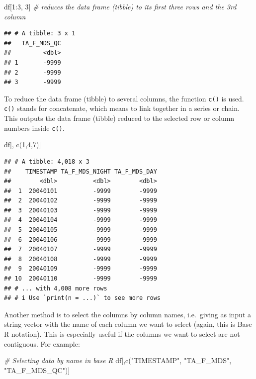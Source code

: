 \documentclass[
]{book}
\newenvironment{Shaded}{\begin{snugshade}}{\end{snugshade}}
\newcommand{\CommentTok}[1]{\textcolor[rgb]{0.56,0.35,0.01}{\textit{#1}}}
\newcommand{\DecValTok}[1]{\textcolor[rgb]{0.00,0.00,0.81}{#1}}
\newcommand{\FunctionTok}[1]{\textcolor[rgb]{0.00,0.00,0.00}{#1}}
\newcommand{\NormalTok}[1]{#1}
\newcommand{\SpecialCharTok}[1]{\textcolor[rgb]{0.00,0.00,0.00}{#1}}
\newcommand{\StringTok}[1]{\textcolor[rgb]{0.31,0.60,0.02}{#1}}
\begin{document}
\begin{Shaded}
\begin{Highlighting}[]
\NormalTok{df[}\DecValTok{1}\SpecialCharTok{:}\DecValTok{3}\NormalTok{, }\DecValTok{3}\NormalTok{] }\CommentTok{\# reduces the data frame (tibble) to its first three rows and the 3rd column}
\end{Highlighting}
\end{Shaded}

\begin{verbatim}
## # A tibble: 3 x 1
##   TA_F_MDS_QC
##         <dbl>
## 1       -9999
## 2       -9999
## 3       -9999
\end{verbatim}

To reduce the data frame (tibble) to several columns, the function \texttt{c()} is used. \texttt{c()} stands for concatenate, which means to link together in a series or chain. This outputs the data frame (tibble) reduced to the selected row or column numbers inside \texttt{c()}.

\begin{Shaded}
\begin{Highlighting}[]
\NormalTok{df[, }\FunctionTok{c}\NormalTok{(}\DecValTok{1}\NormalTok{,}\DecValTok{4}\NormalTok{,}\DecValTok{7}\NormalTok{)]}
\end{Highlighting}
\end{Shaded}

\begin{verbatim}
## # A tibble: 4,018 x 3
##    TIMESTAMP TA_F_MDS_NIGHT TA_F_MDS_DAY
##        <dbl>          <dbl>        <dbl>
##  1  20040101          -9999        -9999
##  2  20040102          -9999        -9999
##  3  20040103          -9999        -9999
##  4  20040104          -9999        -9999
##  5  20040105          -9999        -9999
##  6  20040106          -9999        -9999
##  7  20040107          -9999        -9999
##  8  20040108          -9999        -9999
##  9  20040109          -9999        -9999
## 10  20040110          -9999        -9999
## # ... with 4,008 more rows
## # i Use `print(n = ...)` to see more rows
\end{verbatim}

Another method is to select the columns by column names, i.e.~giving as input a string vector with the name of each column we want to select (again, this is Base R notation). This is especially useful if the columns we want to select are not contiguous. For example:

\begin{Shaded}
\begin{Highlighting}[]
\CommentTok{\# Selecting data by name in base R}
\NormalTok{df[,}\FunctionTok{c}\NormalTok{(}\StringTok{"TIMESTAMP"}\NormalTok{, }\StringTok{"TA\_F\_MDS"}\NormalTok{, }\StringTok{"TA\_F\_MDS\_QC"}\NormalTok{)]}
\end{Highlighting}
\end{Shaded}
\end{document}
